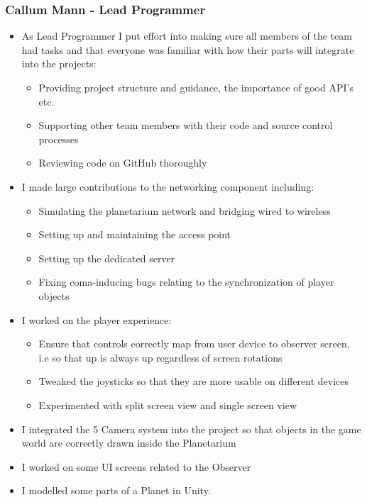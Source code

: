 \documentclass[11pt,a4paper]{article}
\begin{document}
        \subsubsection{Callum Mann - Lead Programmer}
        \begin{itemize}
        \item As Lead Programmer I put effort into making sure all members of the team had tasks and that everyone was familiar with how their parts will integrate into the projects:
        \begin{itemize}
        \item Providing project structure and guidance, the importance of good API’s etc.
        \item Supporting other team members with their code and source control processes
        \item Reviewing code on GitHub thoroughly
        \end{itemize}
        \item I made large contributions to the networking component including:
        \begin{itemize}
        \item Simulating the planetarium network and bridging wired to wireless
        \item Setting up and maintaining the access point
        \item Setting up the dedicated server 
        \item Fixing coma-inducing bugs relating to the synchronization of player objects
        \end{itemize}
        \item I worked on the player experience:
        \begin{itemize}
        \item Ensure that controls correctly map from user device to observer screen, i.e so that up is always up regardless of screen rotations
        \item Tweaked the joysticks so that they are more usable on different devices
        \item Experimented with split screen view and single screen view
        \end{itemize}
        \item I integrated the 5 Camera system into the project so that objects in the game world are correctly drawn inside the Planetarium
        \item I worked on some UI screens related to the Observer
        \item I modelled some parts of a Planet in Unity.
        \end{itemize}
\end{document}
